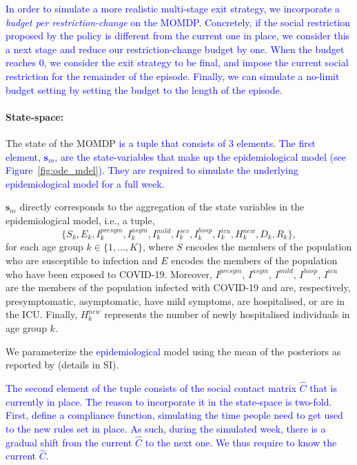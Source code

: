 \documentclass{article}
\newcommand\added[1]{\textcolor{blue}{#1}}
\newcommand{\mdpstate}{\mathbf{s}}
\newcommand{\agegroups}{K}
\begin{document}
\added{In order to simulate a more realistic multi-stage exit strategy, we incorporate a \emph{budget per restriction-change} on the MOMDP. Concretely, if the social restriction proposed by the policy is different from the current one in place, we consider this a next stage and reduce our restriction-change budget by one. When the budget reaches 0, we consider the exit strategy to be final, and impose the current social restriction for the remainder of the episode. Finally, we can simulate a no-limit budget setting by setting the budget to the length of the episode.}

\paragraph{State-space:} The state of the MOMDP \added{is a tuple that consists of 3 elements. The first element, $\mdpstate_m$, are the state-variables that make up the epidemiological model (see Figure~\ref{fig:ode_mdel}). They are required to simulate the underlying epidemiological model for a full week.}

$\mdpstate_m$ directly corresponds to the aggregation of the state variables in the epidemiological model, i.e., a tuple,
\begin{equation}
    \{S_k, E_k, I_k^{presym}, I_k^{asym}, I_k^{mild}, I_k^{sev}, I_k^{hosp}, I_k^{icu}, H^{new}_k, D_k, R_k\},
\end{equation}
for each age group $k \in \{1, \ldots, \agegroups\}$, where $S$ encodes the members of the population who are susceptible to infection and $E$ encodes the members of the population who have been exposed to COVID-19. Moreover, $I^{presym}$, $I^{asym}$, $I^{mild}$, $I^{hosp}$, $I^{icu}$ are the members of the population infected with COVID-19 and are, respectively, presymptomatic, asymptomatic, have mild symptoms, are hospitalised, or are in the ICU. Finally, $H^{new}_k$ represents the number of newly hospitalised individuals in age group $k$.

We parameterize the \added{epidemiological} model using the mean of the posteriors as reported by \citet{abrams2021modelling} (details in SI).

\added{The second element of the tuple consists of the social contact matrix $\hat{C}$ that is currently in place. The reason to incorporate it in the state-space is two-fold. First, \citet{abrams2021modelling} define a compliance function, simulating the time people need to get used to the new rules set in place. As such, during the simulated week, there is a gradual shift from the current $\hat{C}$ to the next one. We thus require to know the current $\hat{C}$.}
\end{document}
